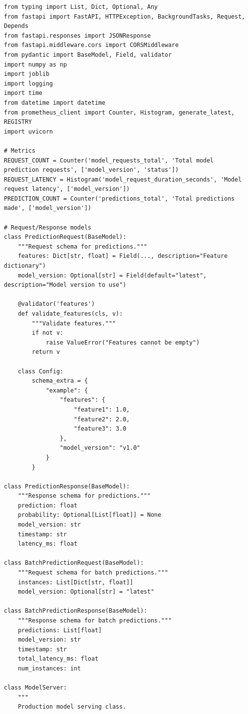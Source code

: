 \begin{lstlisting}[style=python, caption={Production-Grade FastAPI Model Serving}]
from typing import List, Dict, Optional, Any
from fastapi import FastAPI, HTTPException, BackgroundTasks, Request, Depends
from fastapi.responses import JSONResponse
from fastapi.middleware.cors import CORSMiddleware
from pydantic import BaseModel, Field, validator
import numpy as np
import joblib
import logging
import time
from datetime import datetime
from prometheus_client import Counter, Histogram, generate_latest, REGISTRY
import uvicorn

# Metrics
REQUEST_COUNT = Counter('model_requests_total', 'Total model prediction requests', ['model_version', 'status'])
REQUEST_LATENCY = Histogram('model_request_duration_seconds', 'Model request latency', ['model_version'])
PREDICTION_COUNT = Counter('predictions_total', 'Total predictions made', ['model_version'])

# Request/Response models
class PredictionRequest(BaseModel):
    """Request schema for predictions."""
    features: Dict[str, float] = Field(..., description="Feature dictionary")
    model_version: Optional[str] = Field(default="latest", description="Model version to use")

    @validator('features')
    def validate_features(cls, v):
        """Validate features."""
        if not v:
            raise ValueError("Features cannot be empty")
        return v

    class Config:
        schema_extra = {
            "example": {
                "features": {
                    "feature1": 1.0,
                    "feature2": 2.0,
                    "feature3": 3.0
                },
                "model_version": "v1.0"
            }
        }

class PredictionResponse(BaseModel):
    """Response schema for predictions."""
    prediction: float
    probability: Optional[List[float]] = None
    model_version: str
    timestamp: str
    latency_ms: float

class BatchPredictionRequest(BaseModel):
    """Request schema for batch predictions."""
    instances: List[Dict[str, float]]
    model_version: Optional[str] = "latest"

class BatchPredictionResponse(BaseModel):
    """Response schema for batch predictions."""
    predictions: List[float]
    model_version: str
    timestamp: str
    total_latency_ms: float
    num_instances: int

class ModelServer:
    """
    Production model serving class.


\end{lstlisting}
